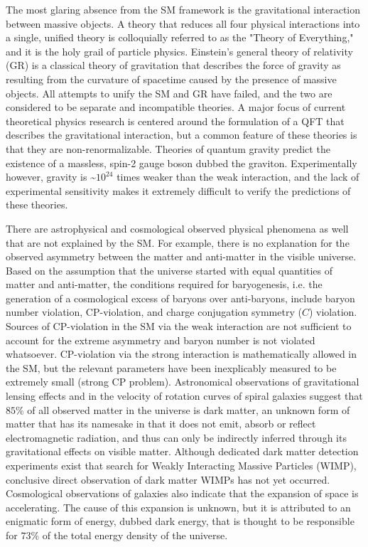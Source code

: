 The most glaring absence from the SM framework is the gravitational interaction between massive objects.
A theory that reduces all four physical interactions into a single, unified theory is colloquially referred to as the "Theory of Everything," and it is the holy grail of particle physics.
Einstein's general theory of relativity (GR) is a classical theory of gravitation that describes the force of gravity as resulting from the curvature of spacetime caused by the presence of massive objects.
All attempts to unify the SM and GR have failed, and the two are considered to be separate and incompatible theories.
A major focus of current theoretical physics research is centered around the formulation of a QFT that describes the gravitational interaction, but a common feature of these theories is that they are non-renormalizable.
Theories of quantum gravity predict the existence of a massless, spin-2 gauge boson dubbed the graviton.
Experimentally however, gravity is \sim$10^{24}$ times weaker than the weak interaction, and the lack of experimental sensitivity makes it extremely difficult to verify the predictions of these theories.

There are astrophysical and cosmological observed physical phenomena as well that are not explained by the SM.
For example, there is no explanation for the observed asymmetry between the matter and anti-matter in the visible universe.
Based on the assumption that the universe started with equal quantities of matter and anti-matter, the conditions required for baryogenesis, i.e. the generation of a cosmological excess of baryons over anti-baryons, include baryon number violation, CP-violation, and charge conjugation symmetry ($C$) violation.
Sources of CP-violation in the SM via the weak interaction are not sufficient to account for the extreme asymmetry and baryon number is not violated whatsoever.
CP-violation via the strong interaction is mathematically allowed in the SM, but the relevant parameters have been inexplicably measured to be extremely small (strong CP problem).
Astronomical observations of gravitational lensing effects and in the velocity of rotation curves of spiral galaxies suggest that $85 \%$ of all observed matter in the universe is dark matter, an unknown form of matter that has its namesake in that it does not emit, absorb or reflect electromagnetic radiation, and thus can only be indirectly inferred through its gravitational effects on visible matter.
Although dedicated dark matter detection experiments exist that search for Weakly Interacting Massive Particles (WIMP), conclusive direct observation of dark matter WIMPs has not yet occurred.
Cosmological observations of galaxies also indicate that the expansion of space is accelerating.
The cause of this expansion is unknown, but it is attributed to an enigmatic form of energy, dubbed dark energy, that is thought to be responsible for $73 \%$ of the total energy density of the universe.

